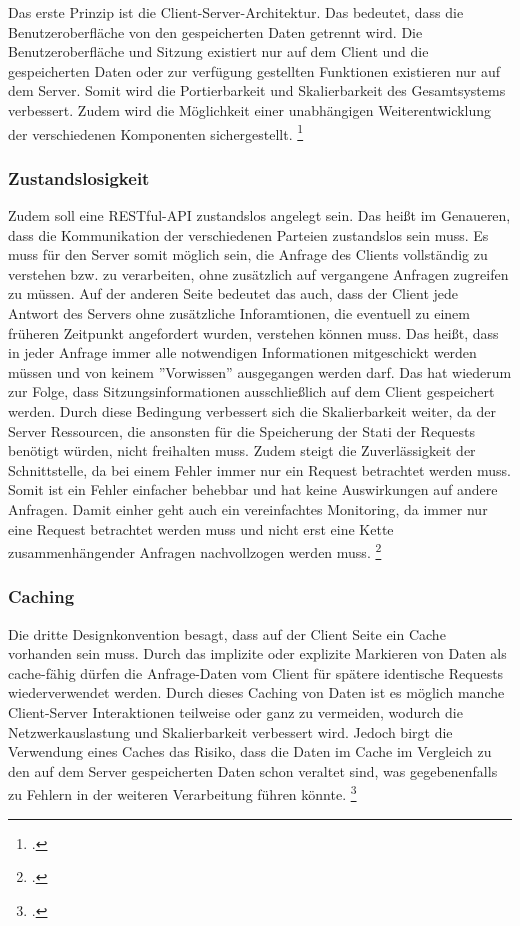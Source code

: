 Das erste Prinzip ist die Client-Server-Architektur. Das bedeutet, dass die Benutzeroberfläche von den gespeicherten Daten getrennt wird. Die Benutzeroberfläche und Sitzung existiert nur auf dem Client und die gespeicherten Daten oder zur verfügung gestellten Funktionen existieren nur auf dem Server. Somit wird die Portierbarkeit und Skalierbarkeit des Gesamtsystems verbessert. Zudem wird die Möglichkeit einer unabhängigen Weiterentwicklung der verschiedenen Komponenten sichergestellt. \footcite[Vgl.][S. 78]{fielding_architectural_2000}

\subsubsection{Zustandslosigkeit}

Zudem soll eine RESTful-API zustandslos angelegt sein. Das hei{\ss}t im Genaueren, dass die Kommunikation der verschiedenen Parteien zustandslos sein muss. Es muss für den Server somit möglich sein, die Anfrage des Clients vollständig zu verstehen bzw. zu verarbeiten, ohne zusätzlich auf vergangene Anfragen zugreifen zu müssen. Auf der anderen Seite bedeutet das auch, dass der Client jede Antwort des Servers ohne zusätzliche Inforamtionen, die eventuell zu einem früheren Zeitpunkt angefordert wurden, verstehen können muss. Das hei{\ss}t, dass in jeder Anfrage immer alle notwendigen Informationen mitgeschickt werden müssen und von keinem ''Vorwissen'' ausgegangen werden darf. Das hat wiederum zur Folge, dass Sitzungsinformationen ausschlie{\ss}lich auf dem Client gespeichert werden. Durch diese Bedingung verbessert sich die Skalierbarkeit weiter, da der Server Ressourcen, die ansonsten für die Speicherung der Stati der Requests benötigt würden, nicht freihalten muss. Zudem steigt die Zuverlässigkeit der Schnittstelle, da bei einem Fehler immer nur ein Request betrachtet werden muss. Somit ist ein Fehler einfacher behebbar und hat keine Auswirkungen auf andere Anfragen. Damit einher geht auch ein vereinfachtes Monitoring, da immer nur eine Request betrachtet werden muss und nicht erst eine Kette zusammenhängender Anfragen nachvollzogen werden muss. \footcite[Vgl.][S. 78f]{fielding_architectural_2000}

\subsubsection{Caching}

Die dritte Designkonvention besagt, dass auf der Client Seite ein Cache vorhanden sein muss. Durch das implizite oder explizite Markieren von Daten als cache-fähig dürfen die Anfrage-Daten vom Client für spätere identische Requests wiederverwendet werden. Durch dieses Caching von Daten ist es möglich manche Client-Server Interaktionen teilweise oder ganz zu vermeiden, wodurch die Netzwerkauslastung und Skalierbarkeit verbessert wird. Jedoch birgt die Verwendung eines Caches das Risiko, dass die Daten im Cache im Vergleich zu den auf dem Server gespeicherten Daten schon veraltet sind, was gegebenenfalls zu Fehlern in der weiteren Verarbeitung führen könnte. \footcite[Vgl.][S. 79ff]{fielding_architectural_2000}

